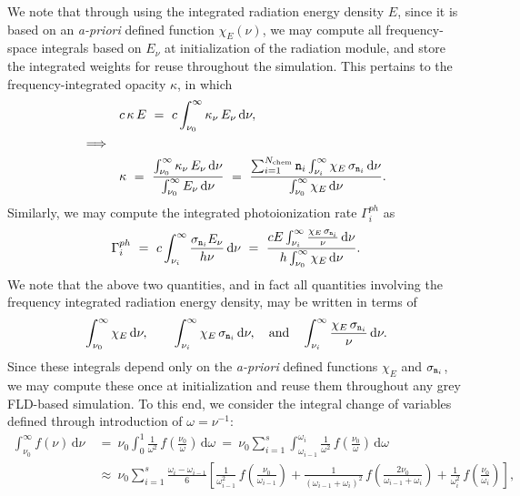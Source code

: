 \documentclass[10pt]{article}
\renewcommand{\(}{\left(}
\renewcommand{\)}{\right)}
\newcommand{\Enu}{E_{\nu}}
\newcommand{\mn}{{\tt n}}
\begin{document}
We note that through using the integrated radiation energy density
$E$, since it is based on an {\em a-priori} defined function
$\chi_E(\nu)$, we may compute all frequency-space integrals based on
$\Enu$ at initialization of the radiation module, and store the
integrated weights for reuse throughout the simulation.  This pertains
to the frequency-integrated opacity $\kappa$, in which 
\begin{align}
  \notag
  & c\,\kappa\,E \ = \ c \int_{\nu_0}^{\infty} \kappa_{\nu}\,\Enu\,\mathrm d\nu, \\
  \Longrightarrow\quad &\notag \\
  \label{eq:opacity_integrated}
  &\kappa \ = \ \frac{\int_{\nu_0}^{\infty} \kappa_{\nu}\,\Enu\,\mathrm d\nu}{
  \int_{\nu_0}^{\infty} \Enu\,\mathrm d\nu} \ = \ 
  \frac{\sum_{i=1}^{N_\text{chem}} \mn_i \int_{\nu_i}^{\infty}
    \chi_E\,\sigma_{\mn_i}\,\mathrm d\nu}{
  \int_{\nu_0}^{\infty} \chi_E\,\mathrm d\nu}.
\end{align}
Similarly, we may compute the integrated photoionization rate
$\Gamma_i^{ph}$ as
\[
   \Gamma_i^{ph} 
   \ = \ 
   c \int_{\nu_i}^{\infty} \frac{\sigma_{\mn_i}\Enu}{h\nu}\,\mathrm d\nu
   \ = \ 
   \frac{cE \int_{\nu_i}^{\infty}
     \frac{\chi_E\,\sigma_{\mn_i}}{\nu}\,\mathrm d\nu}{
   h \int_{\nu_0}^{\infty} \chi_E\,\mathrm d\nu}.
\]
We note that the above two quantities, and in fact all quantities
involving the frequency integrated radiation energy density, may be
written in terms of 
\begin{align}
  \label{eq:integrals} 
    \int_{\nu_0}^{\infty} \chi_E\,\mathrm d\nu,  \qquad
    \int_{\nu_i}^{\infty} \chi_E\,\sigma_{\mn_i}\,\mathrm d\nu,  \quad\text{and}\quad
    \int_{\nu_i}^{\infty} \frac{\chi_E\,\sigma_{\mn_i}}{\nu}\,\mathrm d\nu.
\end{align}
Since these integrals depend only on the {\em a-priori} defined
functions $\chi_E$ and $\sigma_{\mn_i}$, we may compute these once at
initialization and reuse them throughout any grey FLD-based
simulation.  To this end, we consider the integral change of variables
defined through introduction of $\omega = \nu^{-1}$:
\begin{equation}
\label{eq:integral_transform}
\begin{split}
  \int_{\nu_0}^{\infty} f({\nu})\, \mathrm d{\nu} &\ = \ 
      \nu_0 \int_0^1 \frac{1}{\omega^2}\,f\left(\frac{{\nu}_0}{\omega}\right)\,\mathrm d\omega \ = \ 
      \nu_0\sum_{i=1}^s \int_{\omega_{i-1}}^{\omega_i} \frac{1}{\omega^2}\,
      f\left(\frac{{\nu}_0}{\omega}\right)\,\mathrm d\omega \\
    &\ \approx \ \nu_0\sum_{i=1}^s \frac{\omega_i-\omega_{i-1}}{6} \left[
      \frac{1}{\omega_{i-1}^2}\,f\left(\frac{{\nu}_0}{\omega_{i-1}}\right) +
      \frac{1}{(\omega_{i-1}+\omega_i)^2}\,f\left(\frac{2{\nu}_0}{\omega_{i-1}+\omega_i}\right) +
      \frac{1}{\omega_i^2}\,f\left(\frac{{\nu}_0}{\omega_i}\right) \right],
\end{split}
\end{equation}
\end{document}
